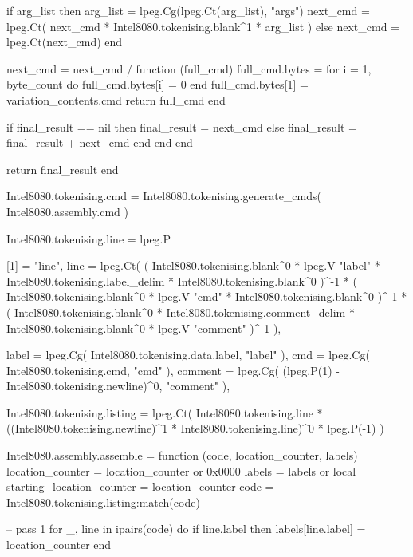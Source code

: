             if arg_list then
                arg_list = lpeg.Cg(lpeg.Ct(arg_list), "args")
                next_cmd = lpeg.Ct(
                    next_cmd * Intel8080.tokenising.blank^1 * arg_list
                )
            else
                next_cmd = lpeg.Ct(next_cmd)
            end

            next_cmd = next_cmd
                / function (full_cmd)
                    full_cmd.bytes = {}
                    for i = 1, byte_count do
                        full_cmd.bytes[i] = 0
                    end
                    full_cmd.bytes[1] = variation_contents.cmd
                    return full_cmd
                end

            if final_result == nil then
                final_result = next_cmd
            else
                final_result = final_result + next_cmd
            end
        end
    end

    return final_result
end

Intel8080.tokenising.cmd = Intel8080.tokenising.generate_cmds(
    Intel8080.assembly.cmd
)

Intel8080.tokenising.line = lpeg.P {
    [1] = "line",
    line = lpeg.Ct(
        (
            Intel8080.tokenising.blank^0
            * lpeg.V "label"
            * Intel8080.tokenising.label_delim
            * Intel8080.tokenising.blank^0
        )^-1
        *
        (
            Intel8080.tokenising.blank^0
            * lpeg.V "cmd"
            * Intel8080.tokenising.blank^0
        )^-1
        *
        (
            Intel8080.tokenising.blank^0
            * Intel8080.tokenising.comment_delim
            * Intel8080.tokenising.blank^0
            * lpeg.V "comment"
        )^-1
    ),

    label = lpeg.Cg(
        Intel8080.tokenising.data.label, "label"
    ),
    cmd = lpeg.Cg(
        Intel8080.tokenising.cmd, "cmd"
    ),
    comment = lpeg.Cg(
        (lpeg.P(1) - Intel8080.tokenising.newline)^0, "comment"
    ),
}

Intel8080.tokenising.listing = lpeg.Ct(
    Intel8080.tokenising.line * ((Intel8080.tokenising.newline)^1 * Intel8080.tokenising.line)^0 * lpeg.P(-1)
)

Intel8080.assembly.assemble = function (code, location_counter, labels)
    location_counter = location_counter or 0x0000
    labels = labels or {}
    local starting_location_counter = location_counter
    code = Intel8080.tokenising.listing:match(code)

    -- pass 1
    for _, line in ipairs(code) do
        if line.label then
            labels[line.label] = location_counter
        end

